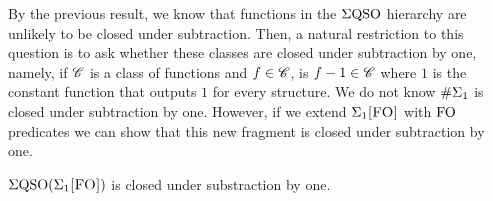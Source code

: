 By the previous result, we know that functions in the $\Sigma{\rm QSO}$ hierarchy are unlikely to be closed under subtraction. Then, a natural restriction to this question is to ask whether these classes are closed under subtraction by one, namely, if $\mathscr{C}$ is a class of functions and $f \in \mathscr{C}$, is $f-1 \in \mathscr{C}$ where $1$ is the constant function that outputs $1$ for every structure. 
We do not know $\#\Sigma_{1}$ is closed under subtraction by one. However, if we extend $\Sigma_{1}\textsc{[FO]}$ with ${\rm FO}$ predicates we can show that this new fragment is closed under subtraction by one.
\begin{theorem} \label{sigmafo-minusone}
	$\Sigma{\rm QSO}(\Sigma_{1}\textsc{[FO]})$ is closed under substraction by one.
\end{theorem}


 





%

